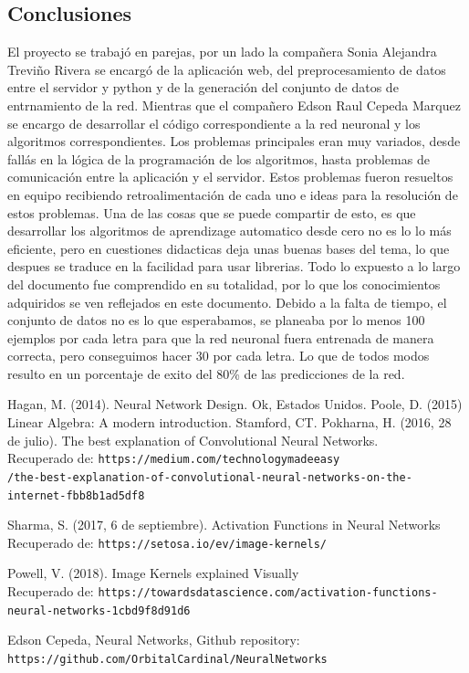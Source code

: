 \documentclass{article}
\begin{document}
\subsection{Conclusiones}
El proyecto se trabajó en parejas, por un lado la compañera Sonia Alejandra Treviño Rivera se encargó de la aplicación web, del preprocesamiento de datos entre el servidor y python y de la generación del conjunto 
de datos de entrnamiento de la red. Mientras que el compañero Edson Raul Cepeda Marquez se encargo de desarrollar el código correspondiente a la red neuronal y los algoritmos correspondientes. Los problemas principales eran muy variados,
desde fallás en la lógica de la programación de los algoritmos, hasta problemas de comunicación entre la aplicación y el servidor. Estos problemas fueron resueltos en equipo recibiendo retroalimentación de cada uno e ideas para la resolución de estos problemas. 
Una de las cosas que se puede compartir de esto, es que desarrollar los algoritmos de aprendizage automatico desde cero no es lo lo más eficiente, pero en cuestiones didacticas deja unas buenas bases del tema, lo que despues se traduce en la facilidad para usar
librerias. Todo lo expuesto a lo largo del documento fue comprendido en su totalidad, por lo que los conocimientos adquiridos se ven reflejados en este documento. 
Debido a la falta de tiempo, el conjunto de datos no es lo que esperabamos, se planeaba por lo menos 100 ejemplos por cada letra para que la red neuronal fuera entrenada de manera correcta, pero conseguimos hacer 30 por cada letra. Lo que de todos modos
resulto en un porcentaje de exito del 80\% de las predicciones de la red.
\begin{thebibliography}{9}

    Hagan, M. (2014). Neural Network Design. Ok, Estados Unidos.
    Poole, D. (2015) Linear Algebra: A modern introduction. Stamford, CT. 
    Pokharna, H. (2016, 28 de julio). The best explanation of Convolutional Neural Networks. \\
    Recuperado de: \texttt{https://medium.com/technologymadeeasy} \\
    \texttt{/the-best-explanation-of-convolutional-neural-networks-on-the-internet-fbb8b1ad5df8}
    
    Sharma, S. (2017, 6 de septiembre). Activation Functions in Neural Networks \\
    Recuperado de: \texttt{https://setosa.io/ev/image-kernels/}
    
    
    Powell, V. (2018). Image Kernels explained Visually
     \\
    Recuperado de: \texttt{https://towardsdatascience.com/activation-functions-neural-networks-1cbd9f8d91d6}
    
    
    Edson Cepeda, Neural Networks, Github repository: \\
    \texttt{https://github.com/OrbitalCardinal/NeuralNetworks}
    
    \end{thebibliography}
\end{document}

